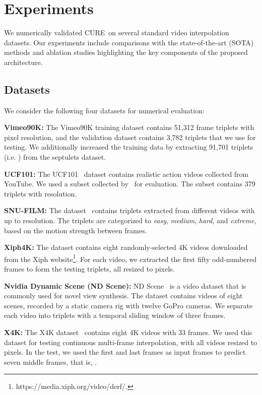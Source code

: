 \documentclass[12pt]{article}
\def\proposed{CURE}
\begin{document}
\section{Experiments}
\label{sec:experiments}

We numerically validated \proposed~on several standard video interpolation datasets. Our experiments include comparisons with the state-of-the-art (SOTA) methods and ablation studies highlighting the key components of the proposed architecture.  

\subsection{Datasets}
We consider the following four datasets for numerical evaluation:


\textbf{Vimeo90K:} The Vimeo90K training dataset contains 51,312 frame triplets with  pixel resolution, and the validation dataset contains 3,782 triplets that we use for testing. We additionally increased the training data by extracting 91,701 triplets (i.e. ) from the septulets dataset.

\textbf{UCF101:} The UCF101~\cite{Soomro.etal2012} dataset contains realistic action videos collected from YouTube.
We used a subset collected by~\cite{Liu.etal2017video} for evaluation. The subset contains 379 triplets with  resolution.

\textbf{SNU-FILM:} The dataset~\cite{choi2020channel} contains  triplets extracted from different videos with up to  resolution. The triplets are categorized to \emph{easy}, \emph{medium}, \emph{hard}, and \emph{extreme}, based on the motion strength between frames.

\textbf{Xiph4K:} The dataset contains eight randomly-selected 4K videos downloaded from the Xiph website\footnote{https://media.xiph.org/video/derf/.}. For each video, we extracted the first fifty odd-numbered frames to form the testing triplets, all resized to  pixels.

\textbf{Nvidia Dynamic Scene (ND Scene):} ND Scene~\cite{yoon2020novel} is a video dataset that is commonly used for novel view synthesis. The dataset contains videos of eight scenes, recorded by a static camera rig with twelve GoPro cameras. We separate each video into triplets with a temporal sliding window of three frames. 

\textbf{X4K:} The X4K dataset~\cite{sim2021xvfi} contains eight 4K videos with 33 frames. 
We used this dataset for testing continuous multi-frame interpolation, with all videos resized to  pixels.
In the test, we used the first and last frames as input frames to predict seven middle frames, that is, . 
\end{document}
